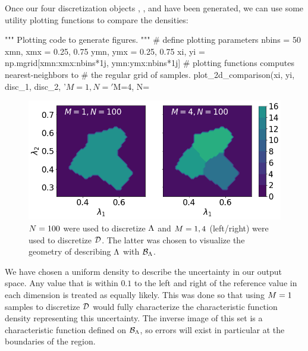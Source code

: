 Once our four discretization objects , ,  and  have been generated, we can use some utility plotting functions to compare the densities:

\begin{python}
"""
Plotting code to generate figures.
"""
# define plotting parameters
nbins = 50
xmn, xmx = 0.25, 0.75
ymn, ymx = 0.25, 0.75
xi, yi = np.mgrid[xmn:xmx:nbins*1j, ymn:ymx:nbins*1j]
# plotting functions computes nearest-neighbors to
# the regular grid of samples.
plot_2d_comparison(xi, yi, disc_1, disc_2,
                   '$M=1, N=%
                   '$M=4, N=%
\end{python}

\begin{figure}[ht]
\begin{minipage}{.975\textwidth}
  \includegraphics[width=\linewidth]{./examples/identity/set/M1-N100_N100-vs-M4-N100_N100.png}
\end{minipage}
\caption{
$N=100$ were used to discretize ${\Lambda}$ and $M=1, 4$ (left/right) were used to discretize $\mathcal{D}$.
The latter was chosen to visualize the geometry of describing ${\Lambda}$ with $\mathcal{B}_{{\Lambda}}$.
}
\label{fig:ex:identity_set_1E2}
\end{figure}

We have chosen a uniform density to describe the uncertainty in our output space.
Any value that is within $0.1$ to the left and right of the reference value  in each dimension is treated as equally likely.
This was done so that using $M = 1$ samples to discretize $\mathcal{D}$ would fully characterize the characteristic function density representing this uncertainty.
The inverse image of this set is a characteristic function defined on $\mathcal{B}_{{\Lambda}}$, so errors will exist in particular at the boundaries of the region.

